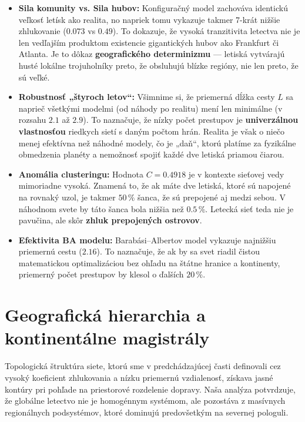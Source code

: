 \begin{itemize}
    \item \textbf{Sila komunity vs. Sila hubov:} Konfiguračný model zachováva identickú veľkosť letísk ako realita, no napriek tomu vykazuje takmer
    7-krát nižšie zhlukovanie ($0.073$ vs $0.49$). To dokazuje, že vysoká tranzitivita letectva nie je len vedľajším produktom existencie gigantických
    hubov ako Frankfurt či Atlanta. Je to dôkaz \textbf{geografického determinizmu} — letiská vytvárajú husté lokálne trojuholníky preto, že obsluhujú
    blízke regióny, nie len preto, že sú veľké.

    \item \textbf{Robustnosť „štyroch letov“:} Všimnime si, že priemerná dĺžka cesty $L$ sa naprieč všetkými modelmi (od náhody po realitu) mení len
    minimálne (v rozsahu $2.1$ až $2.9$). To naznačuje, že nízky počet prestupov je \textbf{univerzálnou vlastnosťou} riedkych sietí s daným počtom
    hrán. Realita je však o niečo menej efektívna než náhodné modely, čo je „daň“, ktorú platíme za fyzikálne obmedzenia planéty a nemožnosť spojiť
    každé dve letiská priamou čiarou.

    \item \textbf{Anomália clusteringu:} Hodnota $C = 0.4918$ je v kontexte sieťovej vedy mimoriadne vysoká. Znamená to, že ak máte dve letiská,
    ktoré sú napojené na rovnaký uzol, je takmer $50\,\%$ šanca, že sú prepojené aj medzi sebou. V náhodnom svete by táto šanca bola nižšia než
    $0.5\,\%$. Letecká sieť teda nie je pavučina, ale skôr \textbf{zhluk prepojených ostrovov}.

    \item \textbf{Efektivita BA modelu:} Barabási–Albertov model vykazuje najnižšiu priemernú cestu ($2.16$). To naznačuje, že ak by sa svet riadil
    čistou matematickou optimalizáciou bez ohľadu na štátne hranice a kontinenty, priemerný počet prestupov by klesol o ďalších $20\,\%$.
\end{itemize}

\section{Geografická hierarchia a kontinentálne magistrály}
Topologická štruktúra siete, ktorú sme v predchádzajúcej časti definovali cez vysoký koeficient zhlukovania a nízku priemernú vzdialenosť, získava
jasné kontúry pri pohľade na priestorové rozdelenie dopravy. Naša analýza potvrdzuje, že globálne letectvo nie je homogénnym systémom, ale pozostáva
z masívnych regionálnych podsystémov, ktoré dominujú predovšetkým na severnej pologuli.

